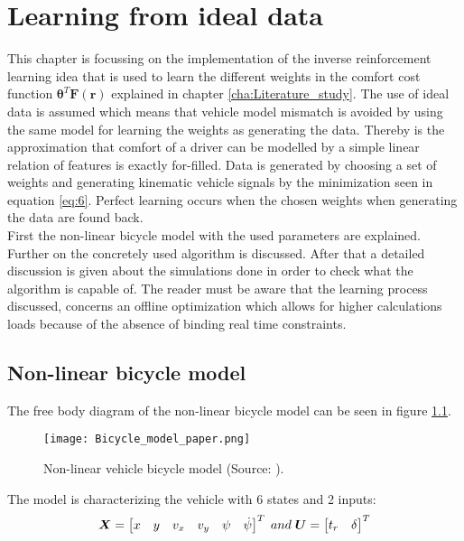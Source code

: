 \chapter{Learning from ideal data\\}
\label{cha:Learning_algorithm}

This chapter is focussing on the implementation of the inverse reinforcement learning idea that is used to learn the different weights in the comfort cost function $\bm{\theta}^T\bm{F}(\bm{r})$
explained in chapter \ref{cha:Literature_study}. The use of ideal data is assumed which means that vehicle model mismatch is avoided by using the same model for learning the weights as generating the data. Thereby is the approximation that comfort of a driver can be modelled by a simple linear relation of features is exactly for-filled. Data is generated by choosing a set of weights and generating kinematic vehicle signals by the minimization seen in equation \ref{eq:6}. Perfect learning occurs when the chosen weights when generating the data are found back.\\

First the non-linear bicycle model with the used parameters are explained. Further on the concretely used algorithm is discussed. After that a detailed discussion is given about the simulations done in order to check what the algorithm is capable of. The reader must be aware that the learning process discussed, concerns an offline optimization which allows for higher calculations loads because of the absence of binding real time constraints.


\section{Non-linear bicycle model}\label{sec:Vehicle_models}
The free body diagram of the non-linear bicycle model can be seen in figure \ref{fig:bicycle_model}.\\

\begin{figure}[h!]
	\centering
	\texttt{[image: Bicycle\_model\_paper.png]}
	\caption{Non-linear vehicle bicycle model (Source: \cite{TongDuySon2019}).}
	\label{fig:bicycle_model}
\end{figure}

The model is characterizing the vehicle with 6 states and 2 inputs:
\begin{equation}\label{eq:bicycle_model}
\centering
\bm{X} = 
\begin{bmatrix}
x & y & v_x & v_y & \psi & \dot{\psi}
\end{bmatrix}^{T}
\; and \; \bm{U} = 
\begin{bmatrix}
t_r & \delta
\end{bmatrix}^{T}
\end{equation}

